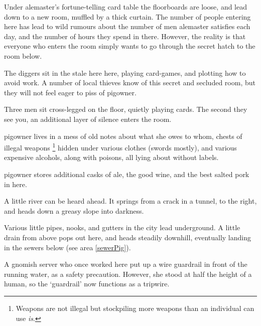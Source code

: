 Under \gls{alemaster}'s fortune-telling card table the floorboards are loose, and lead down to a new room, muffled by a thick curtain.
The number of people entering here has lead to wild rumours about the number of men \gls{alemaster} satisfies each day, and the number of hours they spend in there.
However, the reality is that everyone who enters the room simply wants to go through the secret hatch to the room below.

\alemaster


The \glspl{digger} sit in the stale here here, playing card-games, and plotting how to avoid work.
A number of local thieves know of this secret and secluded room, but they will not feel eager to piss of \gls{pigowner}.

\begin{boxtext}
  Three men sit cross-legged on the floor, quietly playing cards.
  The second they see you, an additional layer of silence enters the room.
\end{boxtext}



\Gls{pigowner} lives in a mess of old notes about what she owes to whom, chests of illegal weapons%
\footnote{Weapons are not illegal but stockpiling more weapons than an individual can use \emph{is}.}
hidden under various clothes (swords mostly), and various expensive alcohols, along with poisons, all lying about without labels.


\Gls{pigowner} stores additional casks of ale, the good wine, and the best salted pork in here.

\begin{boxtext}
  A little river can be heard ahead.
  It springs from a crack in a tunnel, to the right, and heads down a greasy slope into darkness.
\end{boxtext}


Various little pipes, nooks, and gutters in the city lead underground.
A little drain from above pops out here, and heads steadily downhill, eventually landing in the sewers below (see area \vref{sewerPig}).

A gnomish \gls{server} who once worked here put up a wire guardrail in front of the running water, as a safety precaution.
However, she stood at half the height of a human, so the `guardrail' now functions as a tripwire.

